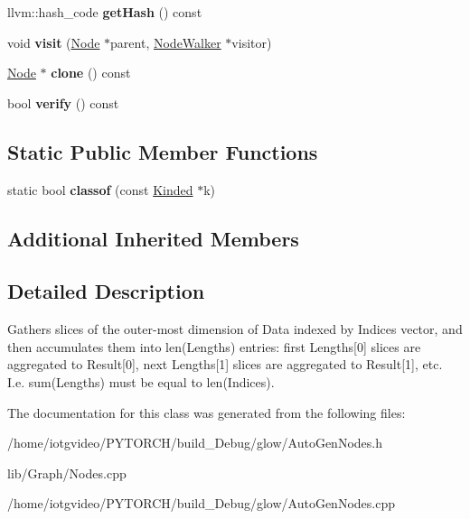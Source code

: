 \begin{DoxyCompactItemize}
\item 
\mbox{\label{classglow_1_1_sparse_lengths_sum_node_a33bab6f06bc6b267725c0844137cbf03}} 
llvm\+::hash\+\_\+code {\bfseries get\+Hash} () const
\item 
\mbox{\label{classglow_1_1_sparse_lengths_sum_node_aa4874a3c891a37920b6f49821e423e1e}} 
void {\bfseries visit} (\hyperlink{classglow_1_1_node}{Node} $\ast$parent, \hyperlink{classglow_1_1_node_walker}{Node\+Walker} $\ast$visitor)
\item 
\mbox{\label{classglow_1_1_sparse_lengths_sum_node_a1c0e5edb4b85dbc49318f1d3c1008ce9}} 
\hyperlink{classglow_1_1_node}{Node} $\ast$ {\bfseries clone} () const
\item 
\mbox{\label{classglow_1_1_sparse_lengths_sum_node_a02d998d05eb421011843940c270c1631}} 
bool {\bfseries verify} () const
\end{DoxyCompactItemize}
\subsection*{Static Public Member Functions}
\begin{DoxyCompactItemize}
\item 
\mbox{\label{classglow_1_1_sparse_lengths_sum_node_aab23422d951eb0b27c2bdb0fae708f6a}} 
static bool {\bfseries classof} (const \hyperlink{classglow_1_1_kinded}{Kinded} $\ast$k)
\end{DoxyCompactItemize}
\subsection*{Additional Inherited Members}


\subsection{Detailed Description}
Gathers slices of the outer-\/most dimension of Data indexed by Indices vector, and then accumulates them into len(\+Lengths) entries\+: first Lengths\mbox{[}0\mbox{]} slices are aggregated to Result\mbox{[}0\mbox{]}, next Lengths\mbox{[}1\mbox{]} slices are aggregated to Result\mbox{[}1\mbox{]}, etc. I.\+e. sum(\+Lengths) must be equal to len(\+Indices). 

The documentation for this class was generated from the following files\+:\begin{DoxyCompactItemize}
\item 
/home/iotgvideo/\+P\+Y\+T\+O\+R\+C\+H/build\+\_\+\+Debug/glow/Auto\+Gen\+Nodes.\+h\item 
lib/\+Graph/Nodes.\+cpp\item 
/home/iotgvideo/\+P\+Y\+T\+O\+R\+C\+H/build\+\_\+\+Debug/glow/Auto\+Gen\+Nodes.\+cpp\end{DoxyCompactItemize}
